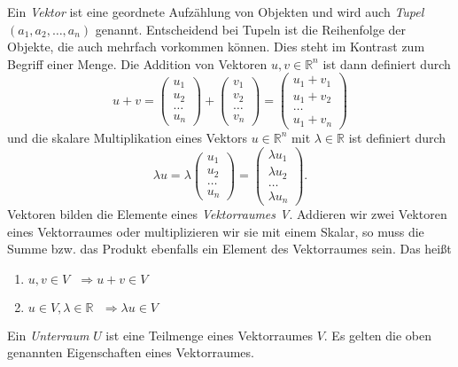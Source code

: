 Ein \textit{Vektor} ist eine geordnete Aufz\"ahlung von Objekten und wird auch \textit{Tupel} $(a_1, a_2,\dots,a_n)$ genannt. Entscheidend bei Tupeln ist die Reihenfolge der Objekte, die auch mehrfach vorkommen k\"onnen. Dies steht im Kontrast zum Begriff einer Menge. Die Addition von Vektoren $u, v\in\mathbb{R}^n$ ist dann definiert durch
\begin{equation*}
u + v = \begin{pmatrix} u_1 \\ u_2 \\ \dots \\ u_n \end{pmatrix} + \begin{pmatrix} v_1 \\ v_2 \\ \dots \\ v_n \end{pmatrix} = \begin{pmatrix} u_1 + v_1 \\ u_1+v_2 \\ \dots \\ u_1+v_n \end{pmatrix}
\end{equation*} 
und die skalare Multiplikation eines Vektors $u\in\mathbb{R}^n$ mit $\lambda\in\mathbb{R}$ ist definiert durch
\begin{equation*}
\lambda u = \lambda \begin{pmatrix} u_1 \\ u_2 \\ \dots \\ u_n \end{pmatrix} = \begin{pmatrix} \lambda u_1 \\ \lambda u_2 \\ \dots \\ \lambda u_n \end{pmatrix}.
\end{equation*}
Vektoren bilden die Elemente eines \textit{Vektorraumes V}. Addieren wir zwei Vektoren eines Vektorraumes oder multiplizieren wir sie mit einem Skalar, so muss die Summe bzw. das Produkt ebenfalls ein Element des Vektorraumes sein. Das hei\ss t
\begin{enumerate}
\item $u, v \in V \text{ }\Rightarrow u+v \in V$
\item $u\in V, \lambda \in \mathbb{R} \text{ }\Rightarrow \lambda u \in V$
\end{enumerate}
\vspace{10pt}
Ein \textit{Unterraum} $U$ ist eine Teilmenge eines Vektorraumes $V$. Es gelten die oben genannten Eigenschaften eines Vektorraumes.


